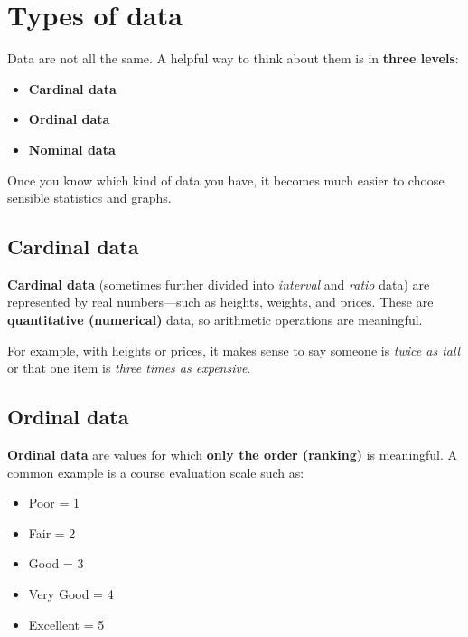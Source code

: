 \documentclass[
  letterpaper,
  DIV=11,
  numbers=noendperiod]{scrreprt}
\providecommand{\tightlist}{%
  \setlength{\itemsep}{0pt}\setlength{\parskip}{0pt}}
\begin{document}
\section{Types of data}\label{types-of-data}

Data are not all the same. A helpful way to think about them is in
\textbf{three levels}:

\begin{itemize}
\tightlist
\item
  \textbf{Cardinal data}
\item
  \textbf{Ordinal data}
\item
  \textbf{Nominal data}
\end{itemize}

Once you know which kind of data you have, it becomes much easier to
choose sensible statistics and graphs.

\subsection{Cardinal data}\label{cardinal-data}

\textbf{Cardinal data} (sometimes further divided into \emph{interval}
and \emph{ratio} data) are represented by real numbers---such as
heights, weights, and prices. These are \textbf{quantitative
(numerical)} data, so arithmetic operations are meaningful.

For example, with heights or prices, it makes sense to say someone is
\emph{twice as tall} or that one item is \emph{three times as
expensive}.

\subsection{Ordinal data}\label{ordinal-data}

\textbf{Ordinal data} are values for which \textbf{only the order
(ranking)} is meaningful. A common example is a course evaluation scale
such as:

\begin{itemize}
\tightlist
\item
  Poor = 1\\
\item
  Fair = 2\\
\item
  Good = 3\\
\item
  Very Good = 4\\
\item
  Excellent = 5
\end{itemize}
\end{document}
